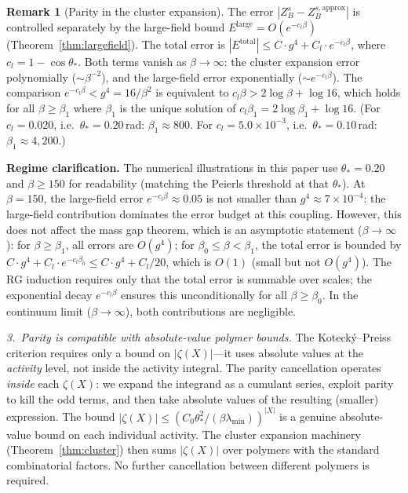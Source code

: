 \documentclass[11pt]{article}
\theoremstyle{definition}
\newtheorem{remark}[theorem]{Remark}
\begin{document}
\begin{remark}[Parity in the cluster expansion]
The error $|Z_B^s - Z_B^{s,\mathrm{approx}}|$ is controlled
separately by the large-field bound $E^{\mathrm{large}}
=O(e^{-c_l\beta})$ (Theorem~\ref{thm:largefield}).
The total error is
$|E^{\mathrm{total}}|\le C\cdot g^4 + C_l\cdot e^{-c_l\beta}$,
where $c_l=1-\cos\theta_*$.  Both terms vanish as
$\beta\to\infty$: the cluster expansion error polynomially
($\sim\beta^{-2}$), and the large-field error exponentially
($\sim e^{-c_l\beta}$).
The comparison $e^{-c_l\beta}<g^4=16/\beta^2$ is equivalent to
$c_l\beta>2\log\beta+\log 16$, which holds for all
$\beta\ge\beta_1$ where $\beta_1$ is the unique solution of
$c_l\beta_1=2\log\beta_1+\log 16$.
(For $c_l=0.020$, i.e.\ $\theta_*=0.20$\,rad:
$\beta_1\approx 800$.
For $c_l=5.0\times 10^{-3}$, i.e.\ $\theta_*=0.10$\,rad:
$\beta_1\approx 4{,}200$.)

\textbf{Regime clarification.}
The numerical illustrations in this paper use $\theta_*=0.20$
and $\beta\ge 150$ for readability (matching the Peierls threshold
at that $\theta_*$).  At $\beta=150$, the large-field error
$e^{-c_l\beta}\approx 0.05$ is not smaller than $g^4\approx 7\times
10^{-4}$: the large-field contribution dominates the error budget
at this coupling.  However, this does not affect the mass gap
theorem, which is an asymptotic statement ($\beta\to\infty$):
for $\beta\ge\beta_1$, all errors are $O(g^4)$; for
$\beta_0\le\beta<\beta_1$, the total error is bounded by
$C\cdot g^4+C_l\cdot e^{-c_l\beta_0}\le C\cdot g^4+C_l/20$,
which is $O(1)$ (small but not $O(g^4)$).  The RG induction
requires only that the total error is summable over scales;
the exponential decay $e^{-c_l\beta}$ ensures this
unconditionally for all $\beta\ge\beta_0$.
In the continuum limit ($\beta\to\infty$), both contributions
are negligible.

\emph{3.~Parity is compatible with absolute-value polymer bounds.}
The Koteck\'y--Preiss criterion requires only a bound on
$|\zeta(X)|$---it uses absolute values at the \emph{activity}
level, not inside the activity integral.  The parity cancellation
operates \emph{inside} each $\zeta(X)$: we expand the integrand
as a cumulant series, exploit parity to kill the odd terms, and
then take absolute values of the resulting (smaller) expression.
The bound $|\zeta(X)|\le(C_0\theta_*^2/(\beta\lambda_{\min}))^{|X|}$
is a genuine absolute-value bound on each individual activity.
The cluster expansion machinery (Theorem~\ref{thm:cluster}) then
sums $|\zeta(X)|$ over polymers with the standard combinatorial
factors.  No further cancellation between different polymers
is required.


\end{remark}
\end{document}
